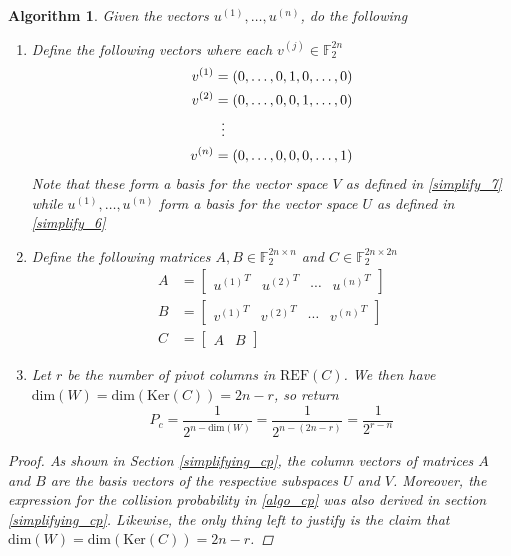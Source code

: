 \documentclass[11pt]{article}
\newtheorem{algorithm}{Algorithm}
\theoremstyle{definition}
\theoremstyle{plain}
\begin{document}
\begin{algorithm}\label{algo_1}
  Given the vectors $u^{(1)}, \ldots, u^{(n)}$, do the following
  \begin{enumerate}[label = (\arabic*)]
  \item Define the following vectors where each $v^{(j)} \in \mathbb{F}_2^{2n}$ 
    \begin{align}
      v^{(1)} &= (0, \ldots, 0, 1, 0, \ldots, 0) \\
      v^{(2)} &= (0, \ldots, 0, 0, 1, \ldots, 0) \\
              & \vdotswithin{=} \nonumber \\
      v^{(n)} &= (0, \ldots, 0, 0, 0, \ldots, 1) 
    \end{align}
    Note that these form a basis for the vector space $V$ as defined in {\ref{simplify_7}} while $u^{(1)}, \ldots, u^{(n)}$ form a basis for the vector space $U$ as defined in {\ref{simplify_6}}
  \item Define the following matrices $A, B \in \mathbb{F}_2^{2n \times n}$ and $C \in \mathbb{F}_2^{2n \times 2n}$ 
    \begin{align}
      A &= \begin{bmatrix} {u^{(1)}}^T & {u^{(2)}}^T & \cdots & {u^{(n)}}^T
      \end{bmatrix} \\
      B &= \begin{bmatrix} {v^{(1)}}^T & {v^{(2)}}^T & \cdots & {v^{(n)}}^T
      \end{bmatrix} \\ 
      C &= \begin{bmatrix} A & B \end{bmatrix} 
    \end{align}
  \item\label{algo_step}
    Let $r$ be the number of pivot columns in $\text{REF}(C)$. We then have $\text{dim}(W) = \text{dim}(\text{Ker}(C)) = 2n - r$, so return
    \begin{equation}\label{algo_cp}
      P_c = \frac{1}{2^{n - \text{dim}(W)}}
      = \frac{1}{2^{n - (2n - r)}} = \frac{1}{2^{r-n}}
    \end{equation}
  \end{enumerate}
\begin{proof}
  As shown in Section {\ref{simplifying_cp}}, the column vectors of matrices $A$ and $B$ are the basis vectors of the respective subspaces $U$ and $V$. Moreover, the expression for the collision probability in {\ref{algo_cp}} was also derived in section {\ref{simplifying_cp}}. Likewise, the only thing left to justify is the claim that $\text{dim}(W) = \text{dim}(\text{Ker}(C)) = 2n - r$.
  

\end{proof}
\end{algorithm}
\end{document}
